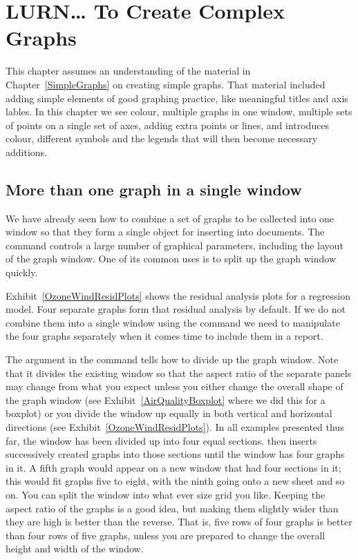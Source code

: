 \chapter{LURN\ldots{} To Create Complex Graphs}
\label{ComplexGraphs}



This chapter assumes an understanding of the material in Chapter~\ref{SimpleGraphs} on creating simple graphs. That material included adding simple elements of good graphing practice, like meaningful titles and axis lables. In this chapter we see colour, multiple graphs in one window, multiple sets of points on a single set of axes, adding extra points or lines, and introduces colour, different symbols and the legends that will then become necessary additions.


\section{More than one graph in a single window}

We have already seen how to combine a set of graphs to be collected into one window so that they form a single object for inserting into documents. The  command controls a large number of graphical parameters, including the layout of the graph window. One of its common uses is to split up the graph window quickly.

Exhibit~\ref{OzoneWindResidPlots}
shows the residual analysis plots for a regression model. Four separate graphs form that residual analysis by default. If we do not combine them into a single window using the  command we need to manipulate the four graphs separately when it comes time to include them in a report.

The  argument in the  command tells \R{} how to divide up the graph window. Note that it divides the existing window so that the aspect ratio of the separate panels may change from what you expect unless you either change the overall shape of the graph window (see Exhibit~\ref{AirQualityBoxplot} where we did this for a boxplot) or you divide the window up equally in both vertical and horizontal directions (see Exhibit~\ref{OzoneWindResidPlots}). In all examples presented thus far, the window has been divided up into four equal sections. \R{} then inserts successively created graphs into those sections until the window has four graphs in it. A fifth graph would appear on a new window that had four sections in it; this would fit graphs five to eight, with the ninth going onto a new sheet and so on. You can split the window into what ever size grid you like. Keeping the aspect ratio of the graphs is a good idea, but making them slightly wider than they are high is better than the reverse. That is, five rows of four graphs is better than four rows of five graphs, unless you are prepared to change the overall height and width of the window.

